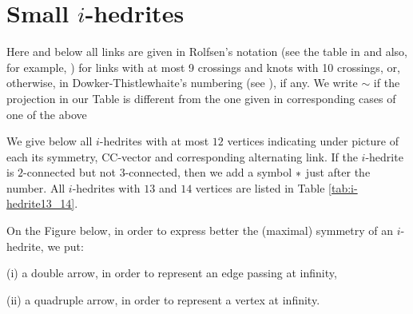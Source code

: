 \documentclass[12pt]{article}
\begin{document}
\section{Small $i$-hedrites}

Here and below all links are given 
in Rolfsen's notation (see the table in \cite{Rolf} and also,  
for example, \cite{Kaw}) for links with at most 9 
crossings and knots with 10 crossings, or, otherwise, in
Dowker-Thistlewhaite's numbering (see \cite{T}), if any.
We write $\sim$ if the projection in our Table is different 
from the one given in corresponding cases of one of the above 

We give below all $i$-hedrites with at most $12$ vertices indicating under 
picture of each its symmetry, CC-vector and corresponding alternating link.
If the $i$-hedrite is $2$-connected but not $3$-connected, then we add
a symbol ${\bf *}$ just after the number. All $i$-hedrites with $13$
and $14$ vertices are listed in Table \ref{tab:i-hedrite13_14}. 


On the Figure below, in order to express better the (maximal)
symmetry of an $i$-hedrite, we put:

(i) a double arrow, in order to represent an edge passing at infinity,

(ii) a quadruple arrow, in order to represent a vertex at infinity.
\end{document}
